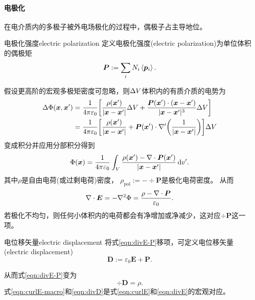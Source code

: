 \paragraph{电极化}
在电介质内的多极子被外电场极化的过程中，偶极子占主导地位。
\begin{definition}
    {电极化强度}{electric polarization}
    定义电极化强度(electric polarization)为单位体积的偶极矩
    \begin{equation}
        \bm P:=\sum_i N_i\left\langle \bm p_i\right\rangle.
    \end{equation}
\end{definition}
假设更高阶的宏观多极矩密度可忽略，则$\Delta V$体积内的有质介质的电势为
\begin{align*}
    \Delta\Phi(\bm x,\bm x')&=\frac1{4\pi\varepsilon_0}\biggl[\frac{\rho(\bm x')}{|\bm x-\bm x'|}\Delta V+\frac{\bm P(\bm x')\cdot(\bm x-\bm x')}{|\bm x-\bm x'|^3}\Delta V\biggr]\\
    &=\frac1{4\pi\varepsilon_0}\biggl[\frac{\rho(\bm x')}{|\bm x-\bm x'|}+\bm P(\bm x')\cdot\nabla'\biggl(\frac1{|\bm x-\bm x'|}\biggr)\biggr]\Delta V
\end{align*}
变成积分并应用分部积分得到
\begin{equation}
    \Phi(\bm x)=\frac1{4\pi\varepsilon_0}\int_V\frac{\rho(\bm x')-\nabla\cdot\bm P(\bm x')}{|\bm x-\bm x'|}\mathop{}\!\mathrm{d} v'.
\end{equation}
其中$\rho$是自由电荷(或过剩电荷)密度，
$\rho_\text{pol}:=-\div\bm P$是极化电荷密度。%
从而
\begin{equation}
    \label{eqn:divE-P}
    \nabla\cdot\bm E=-\nabla^2\Phi=\frac{\rho-\nabla\cdot\bm P}{\varepsilon_0}.
\end{equation}
若极化不均匀，则任何小体积内的电荷都会有净增加或净减少，这对应$\div\bm P$这一项。
\begin{definition}
    {电位移矢量}{electric displacement}
    将式\eqref{eqn:divE-P}移项，可定义电位移矢量(electric displacement)
    \begin{equation}
        \bm D:=\varepsilon_0\bm E+\bm P.
    \end{equation}
\end{definition}
从而式\eqref{eqn:divE-P}变为 
\begin{equation}
    \label{eqn:divD}
    \div\bm D=\rho.
\end{equation}
式\eqref{eqn:curlE-macro}和\eqref{eqn:divD}是式\eqref{eqn:curlE}和\eqref{eqn:divE}的宏观对应。

